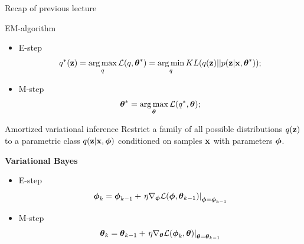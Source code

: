 \begin{frame}{Recap of previous lecture}
	\begin{block}{EM-algorithm}
	\begin{itemize}
		\item E-step
		\[
			q^*(\mathbf{z}) = \operatorname*{arg\,max}_q \mathcal{L} (q, \boldsymbol{\theta}^*)
			= \operatorname*{arg\,min}_q KL(q(\mathbf{z}) || p(\mathbf{z} | \mathbf{x}, \boldsymbol{\theta}^*));
		\]
		\item M-step
		\[
			\boldsymbol{\theta}^* = \operatorname*{arg\,max}_{\boldsymbol{\theta}} \mathcal{L} (q^*, \boldsymbol{\theta});
		\]
	\end{itemize}
	\vspace{-0.3cm}
	\end{block}
	\begin{block}{Amortized variational inference}
	Restrict a family of all possible distributions $q(\mathbf{z})$ to a parametric class $q(\mathbf{z}|\mathbf{x}, \boldsymbol{\phi})$ conditioned on samples $\mathbf{x}$ with parameters $\boldsymbol{\phi}$.
	\end{block}
	
	\textbf{Variational Bayes}
	\begin{itemize}
		\item E-step
		\[
		\boldsymbol{\phi}_k = \boldsymbol{\phi}_{k-1} + \left.\eta \nabla_{\boldsymbol{\phi}} \mathcal{L}(\boldsymbol{\phi}, \boldsymbol{\theta}_{k-1})\right|_{\boldsymbol{\phi}=\boldsymbol{\phi}_{k-1}}
		\]
		\item M-step
		\[
		\boldsymbol{\theta}_k = \boldsymbol{\theta}_{k-1} + \left.\eta \nabla_{\boldsymbol{\theta}} \mathcal{L}(\boldsymbol{\phi}_k, \boldsymbol{\theta})\right|_{\boldsymbol{\theta}=\boldsymbol{\theta}_{k-1}}
		\]
	\end{itemize}
\end{frame}
